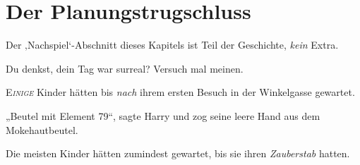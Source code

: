 \chapter{Der Planungstrugschluss}

\begin{chapterOpeningAuthorNote}
%
Der ‚Nachspiel‘-Abschnitt dieses Kapitels ist Teil der Geschichte, \emph{kein} Extra.
\end{chapterOpeningAuthorNote}
\begin{chapterOpeningQuote}
Du denkst, dein Tag war surreal? Versuch mal meinen.
\end{chapterOpeningQuote}

\lettrine{E}{\emph{inige}} Kinder hätten bis \emph{nach} ihrem ersten Besuch in der Winkelgasse gewartet.

„Beutel mit Element 79“, sagte Harry und zog seine leere Hand aus dem Mokehautbeutel.

Die meisten Kinder hätten zumindest gewartet, bis sie ihren \emph{Zauberstab} hatten.


